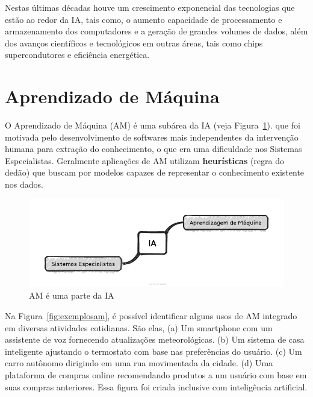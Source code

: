 \documentclass[a4paper,12pt]{book}
\begin{document}
	Nestas últimas décadas houve um crescimento exponencial das tecnologias que  estão ao redor da IA, tais como, o aumento capacidade de processamento e armazenamento dos computadores e a geração de grandes volumes de dados, além dos avanços científicos e tecnológicos em outras áreas, tais como chips supercondutores e eficiência energética.

	\section{Aprendizado de Máquina}

	O Aprendizado de Máquina (AM) é uma subárea da IA (veja Figura~\ref{fig:iaam}). que foi motivada pelo desenvolvimento de softwares mais independentes da intervenção humana para extração do conhecimento, o que era uma dificuldade nos Sistemas Especialistas. Geralmente aplicações de AM utilizam \textbf{heurísticas} (regra do dedão) que buscam por modelos capazes de representar o conhecimento existente nos dados.


	\begin{figure}
		\centering
		\includegraphics[width=0.9\linewidth]{figuras/ia.png}
		\caption{AM é uma parte da IA}
		\label{fig:iaam}
	\end{figure}

	Na Figura~\ref{fig:exemplosam}, é possível identificar alguns usos de AM integrado em diversas atividades cotidianas. São elas, (a) Um smartphone com um assistente de voz fornecendo atualizações meteorológicas. (b) Um sistema de casa inteligente ajustando o termostato com base nas preferências do usuário. (c) Um carro autônomo dirigindo em uma rua movimentada da cidade. (d) Uma plataforma de compras online recomendando produtos a um usuário com base em suas compras anteriores. Essa figura foi criada inclusive com inteligência artificial.
\end{document}
